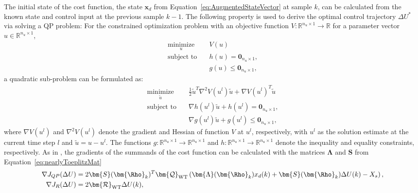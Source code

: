 The initial state of the cost function, the state $\bm{x}_d$ from Equation~\eqref{eq:AugmentedStateVector} at sample $k$, can be calculated from the known state and control input at the previous sample $k-1$. The following property is used to derive the optimal control trajectory $\Delta U^*$ via solving a QP problem: For the constrained optimization problem with an objective function $V: \mathbb{R}^{n_{u} \times 1} \to \mathbb{R}$ for a parameter vector $u \in \mathbb{R}^{n_u \times 1}$,
\begin{align*} 
    \underset{u}{\text{minimize}} & \quad V(u) \\
    \text{subject to} & \quad h(u) = \bm{0}_{n_u \times 1}, \\
    & \quad g(u) \leq \bm{0}_{n_u \times 1},
\end{align*}
a quadratic sub-problem can be formulated as:
\begin{align} 
    \underset{\tilde{u}}{\text{minimize}} & \quad \frac{1}{2} \tilde{u}^T \nabla^2 V(u^l) \tilde{u} + \nabla V(u^l)^T \tilde{u}  \\
    \text{subject to} & \quad \nabla h(u^l)\tilde{u} + h(u^l) = \bm{0}_{n_u \times 1}, \\
    & \quad \nabla g(u^l)\tilde{u} + g(u^l) \leq \bm{0}_{n_u \times 1} \label{eq:linsubproblemIneqConst}, %
\end{align}
where \( \nabla V(u^l) \) and  $\nabla^2 V(u^l)$ denote the gradient and Hessian of  function \( V \) at \( u^l \), respectively, with  \( u^l \) as the solution estimate at the current time step \( l \) and \( \tilde{u} = u - u^l \). The functions $g: \mathbb{R}^{n_{u} \times 1} \to \mathbb{R}^{n_{u} \times 1}$ and $h: \mathbb{R}^{n_{u} \times 1} \to \mathbb{R}^{n_{u} \times 1}$ denote the inequality and equality constraints, respectively. As in \cite{gonzalez2020nonlinear}, the gradients of the summands of the cost function can be calculated with the matrices $\bm{\Lambda}$ and $\bm{S}$ from Equation~\eqref{eq:nearlyToeplitzMat}
\begin{align*}
    \nabla J_{QP}(\Delta U) &= 2\bm{S}(\bm{\Rho}_k)^T \bm{\mathcal{Q}}_{\text{WT}} \left(\bm{\Lambda}(\bm{\Rho}_k)x_d(k) + \bm{S}(\bm{\Rho}_k) \Delta U(k) - X_{s}\right),\\
    \nabla J_R(\Delta U) &= 2 \bm{\mathcal{R}}_{\text{WT}} \Delta U(k),
\end{align*}
